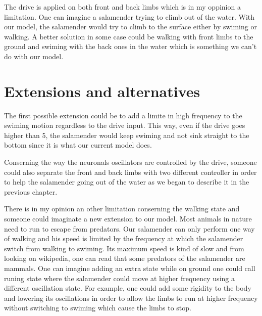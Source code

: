 \documentclass[a4paper]{scrartcl}
\begin{document}
The drive is applied on both front and back limbs which is in my oppinion a limitation. One can imagine a salamender trying to climb out of the water. With our model, the salamender would try to climb to the surface either by swiming or walking. A better solution in some case could be walking with front limbs to the ground and swiming with the back ones in the water which is something we can't do with our model. 

\newpage
\section{Extensions and alternatives}

The first possible extension could be to add a limite in high frequency to the swiming motion regardless to the drive input. This way, even if the drive goes higher than 5, the salamender would keep swiming and not sink straight to the bottom since it is what our current model does.

Conserning the way the neuronals oscillators are controlled by the drive, someone could also separate the front and back limbs with two different controller in order to help the salamender going out of the water as we began to describe it in the previous chapter.

There is in my opinion an other limitation conserning the walking state and someone could imaginate a new extension to our model. Most animals in nature need to run to escape from predators. Our salamender can only perform one way of walking and his speed is limited by the frequency at which the salamender switch from walking to swiming. Its maximum speed is kind of slow and from looking on wikipedia, one can read that some predators of the salamender are mammals. One can imagine adding an extra state while on ground one could call runing state where the salamender could move at higher frequency using a different oscillation state. For example, one could add some rigidity to the body and lowering its oscillations in order to allow the limbs to run at higher frequency without switching to swiming which cause the limbs to stop.

\end{document}
